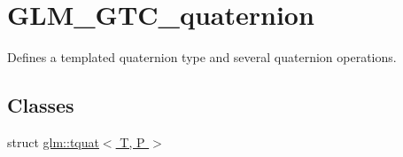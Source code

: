 \hypertarget{group__gtc__quaternion}{}\section{G\+L\+M\+\_\+\+G\+T\+C\+\_\+quaternion}
\label{group__gtc__quaternion}


Defines a templated quaternion type and several quaternion operations.  


\subsection*{Classes}
\begin{DoxyCompactItemize}
\item 
struct \hyperlink{structglm_1_1tquat}{glm\+::tquat$<$ T, P $>$}
\end{DoxyCompactItemize}
